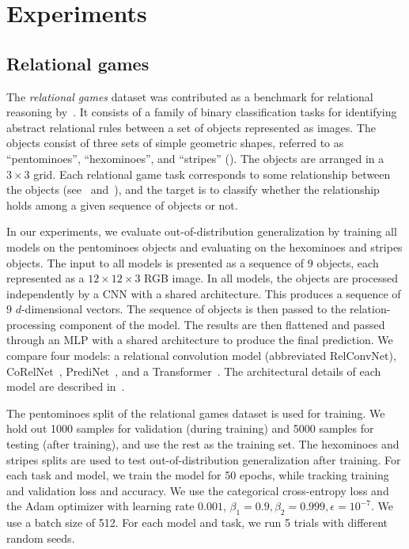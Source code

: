 \section{Experiments}\label{sec:experiments}

\subsection{Relational games}

The \textit{relational games} dataset was contributed as a benchmark for relational reasoning by~\citep{shanahanExplicitlyRelationalNeural}. It consists of a family of binary classification tasks for identifying abstract relational rules between a set of objects represented as images. The objects consist of three sets of simple geometric shapes, referred to as ``pentominoes'', ``hexominoes'', and ``stripes'' (). The objects are arranged in a $3 \times 3$ grid. Each relational game task corresponds to some relationship between the objects (see~ and~), and the target is to classify whether the relationship holds among a given sequence of objects or not.

In our experiments, we evaluate out-of-distribution generalization by training all models on the pentominoes objects and evaluating on the hexominoes and stripes objects. The input to all models is presented as a sequence of $9$ objects, each represented as a $12 \times 12 \times 3$ RGB image. In all models, the objects are processed independently by a CNN with a shared architecture. This produces a sequence of $9$ $d$-dimensional vectors. The sequence of objects is then passed to the relation-processing component of the model. The results are then flattened and passed through an MLP with a shared architecture to produce the final prediction. We compare four models: a relational convolution model (abbreviated RelConvNet), CoRelNet~\citep{kergNeuralArchitecture2022}, PrediNet~\citep{shanahanExplicitlyRelationalNeural}, and a Transformer~\citep{vaswani2017attention}. The architectural details of each model are described in~.

The pentominoes split of the relational games dataset is used for training. We hold out 1000 samples for validation (during training) and 5000 samples for testing (after training), and use the rest as the training set. The hexominoes and stripes splits are used to test out-of-distribution generalization after training. For each task and model, we train the model for 50 epochs, while tracking training and validation loss and accuracy. We use the categorical cross-entropy loss and the Adam optimizer with learning rate $0.001$, $\beta_1 = 0.9, \beta_2 = 0.999, \epsilon = 10^{-7}$. We use a batch size of 512. For each model and task, we run 5 trials with different random seeds.


